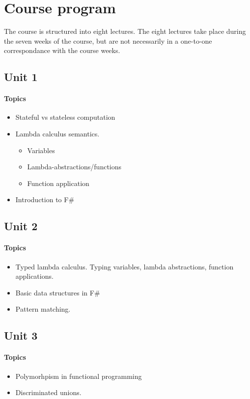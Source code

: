 \section{Course program}
The course is structured into eight lectures.
The eight lectures take place during the seven weeks of the course, but are not necessarily in a one-to-one correspondance with the course weeks.

\subsection*{Unit 1}
\paragraph*{Topics}
\begin{itemize}[noitemsep]
	\item Stateful vs stateless computation
  \item Lambda calculus semantics.
    \begin{itemize}[noitemsep]
      \item Variables
      \item Lambda-abstractions/functions
      \item Function application
    \end{itemize}	
  \item Introduction to F\#
\end{itemize}

\subsection*{Unit 2}
\paragraph*{Topics}			
\begin{itemize}[noitemsep]
	\item Typed lambda calculus. Typing variables, lambda abstractions, function applications.
  \item Basic data structures in F\#
  \item Pattern matching.
\end{itemize}

\subsection*{Unit 3}
\paragraph*{Topics}			
\begin{itemize}[noitemsep]
  \item Polymorhpism in functional programming
	\item Discriminated unions.
\end{itemize}

